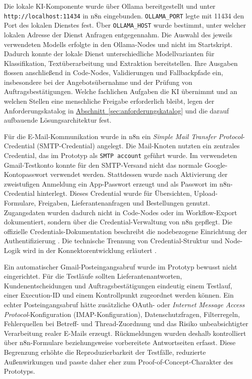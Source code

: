 \documentclass[a4paper,12pt]{article}
\begin{document}
Die lokale KI-Komponente wurde über Ollama bereitgestellt und unter \mbox{\texttt{http://localhost:11434}} in n8n eingebunden. \texttt{OLLAMA\_PORT} legte mit 11434 den Port des lokalen Dienstes fest. Über \texttt{OLLAMA\_HOST} wurde bestimmt, unter welcher lokalen Adresse der Dienst Anfragen entgegennahm. Die Auswahl des jeweils verwendeten Modells erfolgte in den Ollama-Nodes und nicht im Startskript. Dadurch konnte der lokale Dienst unterschiedliche Modellvarianten für Klassifikation, Textüberarbeitung und Extraktion bereitstellen. Ihre Ausgaben flossen anschließend in Code-Nodes, Validierungen und Fallbackpfade ein, insbesondere bei der Angebotsübernahme und der Prüfung von Auftragsbestätigungen. Welche fachlichen Aufgaben die KI übernimmt und an welchen Stellen eine menschliche Freigabe erforderlich bleibt, legen der Anforderungskatalog in \hyperref[sec:anforderungskatalog]{Abschnitt~\ref*{sec:anforderungskatalog}} und die darauf aufbauende Lösungsarchitektur fest.

Für die E-Mail-Kommunikation wurde in n8n ein \textit{Simple Mail Transfer Protocol}-Credential (SMTP-Credential) angelegt. Die Mail-Knoten nutzten ein zentrales Credential, das im Prototyp als \texttt{SMTP account} geführt wurde. Im verwendeten Gmail-Testkonto konnte für den SMTP-Versand nicht das normale Google-Kontopasswort verwendet werden. Stattdessen wurde nach Aktivierung der zweistufigen Anmeldung ein App-Passwort erzeugt und als Passwort im n8n-Credential hinterlegt. Dieses Credential wurde für Übersichten, Upload-Formulare, Freigaben, Lieferantenanfragen und Bestellungen genutzt. Zugangsdaten wurden dadurch nicht in Code-Nodes oder im Workflow-Export dokumentiert, sondern über die Credential-Verwaltung von n8n gepflegt. Die offizielle Credentials-Dokumentation beschreibt die nodebezogene Einrichtung der Authentifizierung \parencite{n8n_docs_2026}. Die technische Trennung von Credential-Struktur und Node-Logik wird in der Konnektorentwicklung erläutert \parencite{edjekoomhene_entwicklung_2024}.

Ein automatischer Gmail-Posteingangsabruf wurde im Prototyp bewusst nicht eingerichtet. Für die Testläufe sollten Lieferantenantworten, Kundenentscheidungen und Auftragsbestätigungen eindeutig einem Testlauf, einer Execution-ID und einem Kontrollpunkt zugeordnet werden können. Ein echter Posteingangsabruf hätte zusätzliche OAuth- oder \textit{Internet Message Access Protocol}-Konfiguration (IMAP-Konfiguration), Datenschutzfragen, Filterregeln, Fehlerquellen bei Betreff- und Thread-Zuordnung und das Risiko unbeabsichtigter Verarbeitung realer E-Mails erzeugt. Rückmeldungen wurden deshalb kontrolliert über n8n-Formulare beziehungsweise vorbereitete Antwortseiten erfasst. Diese Begrenzung erhöhte die Reproduzierbarkeit der Testfälle, reduzierte Außenwirkungen und passte daher eher zum Proof-of-Concept-Charakter des Prototyps.
\end{document}
